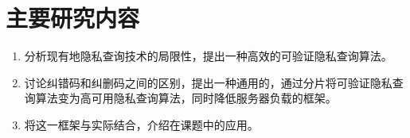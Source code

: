 \section{主要研究内容}
\begin{enumerate}
    \item 分析现有地隐私查询技术的局限性，提出一种高效的可验证隐私查询算法。
    \item 讨论纠错码和纠删码之间的区别，提出一种通用的，通过分片将可验证隐私查询算法变为高可用隐私查询算法，同时降低服务器负载的框架。
    \item 将这一框架与实际结合，介绍在课题中的应用。
\end{enumerate}
